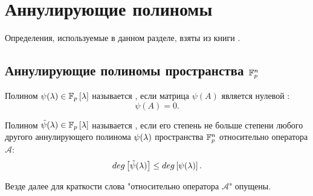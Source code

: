 \section{Аннулирующие полиномы}

Определения, используемые в данном разделе, взяты из книги \cite[с.~171--172]{Gantmacher}.

\subsection{Аннулирующие полиномы пространства $\mathbb{F}^{n}_p$}

\begin{definition} \label{definition:AP:space:annihilating_polynomial}
	Полином $\psi (\lambda) \in \mathbb{F}_p \left [ \lambda \right ]$ называется , если матрица $\psi(A)$ является нулевой :
		$$ \psi(A) = 0. $$
\end{definition}

\begin{definition}
	Полином $\tilde\psi (\lambda) \in \mathbb{F}_p \left [ \lambda \right ]$ называется , если его степень не больше степени любого другого аннулирующего полинома
	$\psi (\lambda)$ пространства $\mathbb{F}^{n}_p$ относительно оператора $\mathcal A$:
		$$ deg \left [ \tilde\psi (\lambda) \right ] \le deg \left [ \psi (\lambda) \right ]. $$
\end{definition}

Везде далее для краткости слова "относительно оператора $\mathcal A$"{} опущены.


